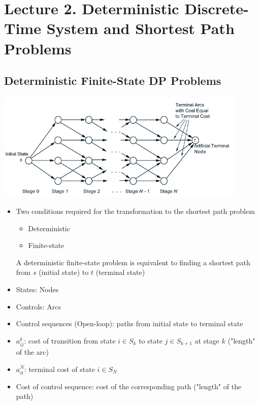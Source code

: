 \section{Lecture 2. Deterministic Discrete-Time System and Shortest Path Problems}
\subsection{Deterministic Finite-State DP Problems}
\centerline{\includegraphics[width=12cm]{Lecture2/Fig1.png}}
\begin{itemize}
    \item Two conditions required for the transformation to the shortest path problem
    \begin{itemize}
        \item Deterministic
        \item Finite-state
    \end{itemize}
    A deterministic finite-state problem is equivalent to finding a shortest path from $s$ (initial state) to $t$ (terminal state)
    \item States: Nodes
    \item Controls: Arcs
    \item Control sequences (Open-loop): paths from initial state to terminal state
    \item $a_{ij}^k$: cost of transition from state $i\in S_k$ to state $j\in S_{k+1}$ at stage $k$ ("length" of the arc)
    \item $a_{it}^N$: terminal cost of state $i\in S_N$
    \item Cost of control sequence: cost of the corresponding path ("length" of the path)
\end{itemize}

